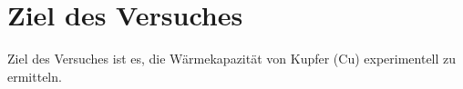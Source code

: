 \section{Ziel des Versuches}
\label{sec:versuchsziel}

Ziel des Versuches ist es, die Wärmekapazität von Kupfer (Cu) experimentell zu ermitteln.